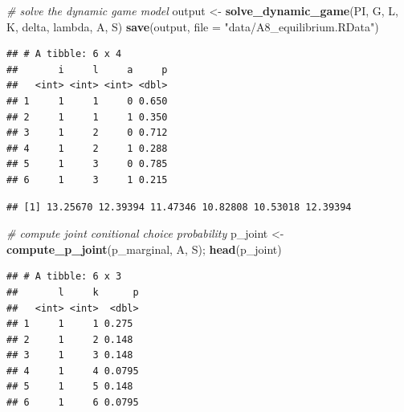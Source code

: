\documentclass[]{book}
\newenvironment{Shaded}{\begin{snugshade}}{\end{snugshade}}
\newcommand{\KeywordTok}[1]{\textcolor[rgb]{0.13,0.29,0.53}{\textbf{#1}}}
\newcommand{\DataTypeTok}[1]{\textcolor[rgb]{0.13,0.29,0.53}{#1}}
\newcommand{\StringTok}[1]{\textcolor[rgb]{0.31,0.60,0.02}{#1}}
\newcommand{\CommentTok}[1]{\textcolor[rgb]{0.56,0.35,0.01}{\textit{#1}}}
\newcommand{\OperatorTok}[1]{\textcolor[rgb]{0.81,0.36,0.00}{\textbf{#1}}}
\newcommand{\NormalTok}[1]{#1}
\begin{document}
\begin{Shaded}
\begin{Highlighting}[]
\CommentTok{# solve the dynamic game model}
\NormalTok{output <-}
\StringTok{  }\KeywordTok{solve_dynamic_game}\NormalTok{(PI, G, L, K, delta, lambda, A, S)}
\KeywordTok{save}\NormalTok{(output, }\DataTypeTok{file =} \StringTok{"data/A8_equilibrium.RData"}\NormalTok{)}
\end{Highlighting}
\end{Shaded}

\begin{Shaded}
\end{Shaded}

\begin{verbatim}
## # A tibble: 6 x 4
##       i     l     a     p
##   <int> <int> <int> <dbl>
## 1     1     1     0 0.650
## 2     1     1     1 0.350
## 3     1     2     0 0.712
## 4     1     2     1 0.288
## 5     1     3     0 0.785
## 6     1     3     1 0.215
\end{verbatim}

\begin{Shaded}
\end{Shaded}

\begin{verbatim}
## [1] 13.25670 12.39394 11.47346 10.82808 10.53018 12.39394
\end{verbatim}

\begin{Shaded}
\begin{Highlighting}[]
\CommentTok{# compute joint conitional choice probability}
\NormalTok{p_joint <-}\StringTok{ }\KeywordTok{compute_p_joint}\NormalTok{(p_marginal, A, S); }\KeywordTok{head}\NormalTok{(p_joint)}
\end{Highlighting}
\end{Shaded}

\begin{verbatim}
## # A tibble: 6 x 3
##       l     k      p
##   <int> <int>  <dbl>
## 1     1     1 0.275 
## 2     1     2 0.148 
## 3     1     3 0.148 
## 4     1     4 0.0795
## 5     1     5 0.148 
## 6     1     6 0.0795
\end{verbatim}
\end{document}
